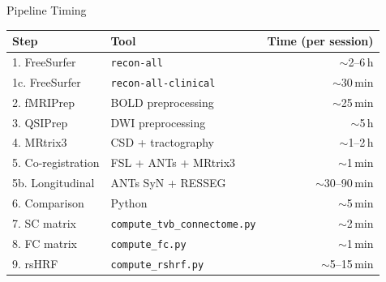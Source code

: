 \begin{frame}{Pipeline Timing}

  \begin{tabular}{llr}
    \toprule
    \textbf{Step} & \textbf{Tool} & \textbf{Time (per session)} \\
    \midrule
    1. FreeSurfer & \texttt{recon-all} & $\sim$2--6\,h \\
    1c. FreeSurfer & \texttt{recon-all-clinical} & $\sim$30\,min \\
    2. fMRIPrep & BOLD preprocessing & $\sim$25\,min \\
    3. QSIPrep & DWI preprocessing & $\sim$5\,h \\
    4. MRtrix3 & CSD + tractography & $\sim$1--2\,h \\
    5. Co-registration & FSL + ANTs + MRtrix3 & $\sim$1\,min \\
    5b. Longitudinal & ANTs SyN + RESSEG & $\sim$30--90\,min \\
    6. Comparison & Python & $\sim$5\,min \\
    7. SC matrix & \texttt{compute\_tvb\_connectome.py} & $\sim$2\,min \\
    8. FC matrix & \texttt{compute\_fc.py} & $\sim$1\,min \\
    9. rsHRF & \texttt{compute\_rshrf.py} & $\sim$5--15\,min \\
    \bottomrule
  \end{tabular}

\end{frame}

